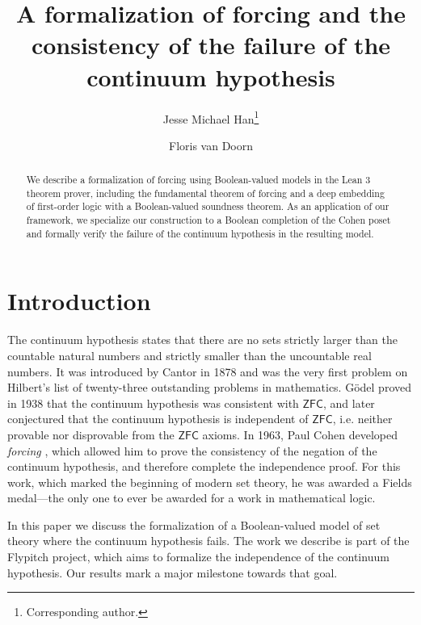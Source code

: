 \documentclass[a4paper,USenglish,cleveref, autoref]{lipics-v2019}
\title{A formalization of forcing and the consistency of the failure of the continuum hypothesis} %
\author{Jesse Michael Han\footnote{Corresponding author.}}{Department of Mathematics, University of Pittsburgh \and \url{https://www.pitt.edu/~jmh288}}{jessemichaelhan@gmail.com}{}{}%
\author{Floris van Doorn}{Department of Mathematics, University of Pittsburgh \and \url{http://florisvandoorn.com/}}{fpvdoorn@gmail.com}{}{}
\theoremstyle{theorem}
\theoremstyle{definition}
\begin{document}
\maketitle

\begin{abstract}
We describe a formalization of forcing using Boolean-valued models in the Lean 3 theorem prover, including the fundamental theorem of forcing and a deep embedding of first-order logic with a Boolean-valued soundness theorem. As an application of our framework, we specialize our construction to a Boolean completion of the Cohen poset and formally verify the failure of the continuum hypothesis in the resulting model.
\end{abstract}

\section*{Introduction}
The continuum hypothesis states that there are no sets strictly larger than the countable natural numbers and strictly smaller than the uncountable real numbers. It was introduced by Cantor \cite{cantor1878beitrag} in 1878 and was the very first problem on Hilbert's list of twenty-three outstanding problems in mathematics. G\"odel \cite{godel1938consistency} proved in 1938 that the continuum hypothesis was consistent with $\mathsf{ZFC}$, and later conjectured that the continuum hypothesis is independent of $\mathsf{ZFC}$, i.e. neither provable nor disprovable from the $\mathsf{ZFC}$ axioms. In 1963, Paul Cohen developed \emph{forcing} \cite{cohen-the-independence-of-the-continuum-hypothesis-1,cohen1964independence2}, which allowed him to prove the consistency of the negation of the continuum hypothesis, and therefore complete the independence proof. For this work, which marked the beginning of modern set theory, he was awarded a Fields medal---the only one to ever be awarded for a work in mathematical logic.

In this paper we discuss the formalization of a Boolean-valued model of set theory where the continuum hypothesis fails. %
The work we describe is part of the Flypitch project, which aims to formalize the independence of the continuum hypothesis. Our results mark a major milestone towards that goal.
\end{document}
